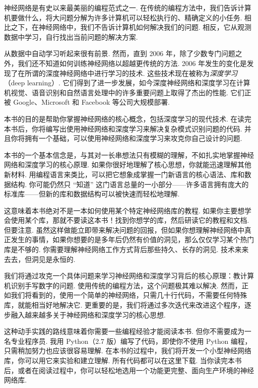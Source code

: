 神经网络\label{term:1}是有史以来最美丽的编程范式之一. 在传统的编程方法中，我们告诉计算机要做什么，将大问题分解为许多计算机可以轻松执行的、精确定义的小任务. 相比之下，在神经网络中，我们不告诉计算机如何解决我们的问题. 相反，它从观测数据中学习，自行找出当前问题的解决方案.

从数据中自动学习听起来很有前景. 然而，直到 2006 年，除了少数专门问题之外，我们还不知道如何训练神经网络以超越更传统的方法. 2006 年发生的变化是发现了在所谓的深度神经网络中进行学习的技术. 这些技术现在被称为\emph{深度学习}（deep learning）\label{term:0}. 它们得到了进一步发展，如今深度神经网络和深度学习在计算机视觉、语音识别和自然语言处理中的许多重要问题上取得了杰出的性能. 它们正被 Google、Microsoft 和 Facebook 等公司大规模部署.

本书的目的是帮助你掌握神经网络的核心概念，包括深度学习的现代技术. 在读完本书后，你将编写出使用神经网络和深度学习来解决复杂模式识别问题的代码. 并且你将拥有一个基础，可以使用神经网络和深度学习来攻克你自己设计的问题.

本书的一个基本信念是，与其对一长串想法只有模糊的理解，不如扎实地掌握神经网络和深度学习的核心原理. 如果你很好地理解了核心思想，你就能迅速理解其他新材料. 用编程语言来类比，可以把它想象成掌握一门新语言的核心语法、库和数据结构. 你可能仍然只 ``知道'' 这门语言总量的一小部分——许多语言拥有庞大的标准库——但新的库和数据结构可以被快速而轻松地理解.

这意味着本书绝对不是一本如何使用某个特定神经网络库的教程. 如果你主要想学会使用某个库，那就不要读这本书！找到你想学的库，然后研读它的教程和文档. 但要注意. 虽然这样做能立即带来解决问题的回报，但如果你想理解神经网络中真正发生的事情，如果你想要的是多年后仍然有价值的洞见，那么仅仅学习某个热门库是不够的. 你需要理解神经网络工作方式背后那些持久、长存的洞见. 技术来来去去，但洞见是永恒的.

我们将通过攻克一个具体问题来学习神经网络和深度学习背后的核心原理：教计算机识别手写数字\label{term:2}的问题. 使用传统的编程方法，这个问题极其难以解决. 然而，正如我们将看到的，使用一个简单的神经网络，只需几十行代码，不需要任何特殊库，就能相当好地解决它. 更重要的是，我们将通过多次迭代来改进这个程序，逐步融入越来越多关于神经网络和深度学习的核心思想.

这种动手实践的路线意味着你需要一些编程经验才能阅读本书. 但你不需要成为一名专业程序员. 我用 Python（2.7 版）编写了代码，即使你不使用 Python 编程，只需稍加努力也应该很容易理解. 在本书的过程中，我们将开发一个小型神经网络库，你可以用它来实验和建立理解. 所有代码都可以在这里下载. 当你读完本书后，或者在阅读过程中，你可以轻松地选用一个功能更完整、面向生产环境的神经网络库.

